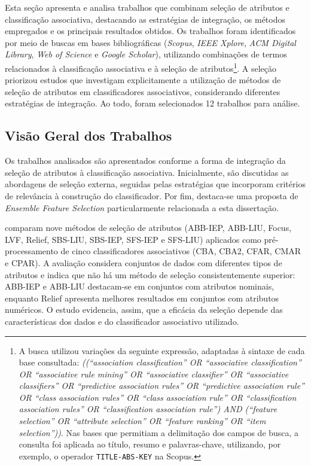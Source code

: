 Esta seção apresenta e analisa trabalhos que combinam seleção de atributos e classificação associativa, destacando as estratégias de integração, os métodos empregados e os principais resultados obtidos. Os trabalhos foram identificados por meio de buscas em bases bibliográficas (\textit{Scopus}, \textit{IEEE Xplore}, \textit{ACM Digital Library}, \textit{Web of Science} e \textit{Google Scholar}), utilizando combinações de termos relacionados à classificação associativa e à seleção de atributos\footnote{A busca utilizou variações da seguinte expressão, adaptadas à sintaxe de cada base consultada: \textit{((``association classification'' OR ``associative classification'' OR ``associative rule mining'' OR ``associative classifier'' OR ``associative classifiers'' OR ``predictive association rules'' OR ``predictive association rule'' OR ``class association rules'' OR ``class association rule'' OR ``classification association rules'' OR ``classification association rule'') AND (``feature selection'' OR ``attribute selection'' OR ``feature ranking'' OR ``item selection''))}. Nas bases que permitiam a delimitação dos campos de busca, a consulta foi aplicada ao título, resumo e palavras-chave, utilizando, por exemplo, o operador \texttt{TITLE-ABS-KEY} na Scopus.}. A seleção priorizou estudos que investigam explicitamente a utilização de métodos de seleção de atributos em classificadores associativos, considerando diferentes estratégias de integração. Ao todo, foram selecionados 12 trabalhos para análise.

\subsection{Visão Geral dos Trabalhos}
\label{subsec:trabalhos-ca}

Os trabalhos analisados são apresentados conforme a forma de integração da seleção de atributos à classificação associativa. Inicialmente, são discutidas as abordagens de seleção externa, seguidas pelas estratégias que incorporam critérios de relevância à construção do classificador. Por fim, destaca-se uma proposta de \textit{Ensemble Feature Selection} particularmente relacionada a esta dissertação.

 comparam nove métodos de seleção de atributos (ABB-IEP, ABB-LIU, Focus, LVF, Relief, SBS-LIU, SBS-IEP, SFS-IEP e SFS-LIU) aplicados como pré-processamento de cinco classificadores associativos (CBA, CBA2, CFAR, CMAR e CPAR). A avaliação considera conjuntos de dados com diferentes tipos de atributos e indica que não há um método de seleção consistentemente superior: ABB-IEP e ABB-LIU destacam-se em conjuntos com atributos nominais, enquanto Relief apresenta melhores resultados em conjuntos com atributos numéricos. O estudo evidencia, assim, que a eficácia da seleção depende das características dos dados e do classificador associativo utilizado.

